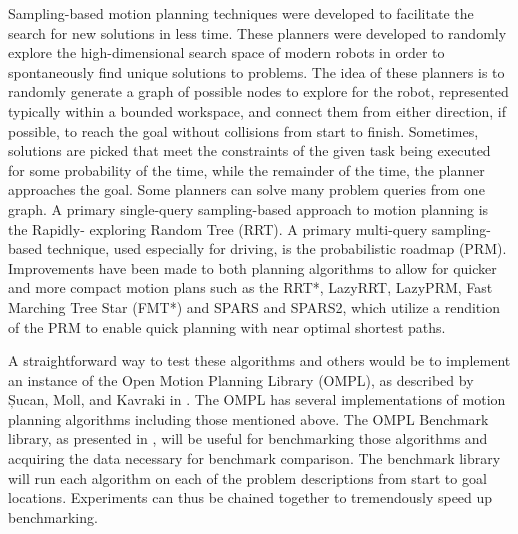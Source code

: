 \documentclass[conference]{IEEEtran} \usepackage[T1]{fontenc} \usepackage[backend=biber, style=ieee]{biblatex}
\begin{document}
Sampling-based motion planning techniques were developed to facilitate the search for new solutions in less time. These planners were developed to randomly explore the
high-dimensional search space of modern robots in order to spontaneously find unique solutions to problems. The idea of these planners is to randomly generate a graph
of possible nodes to explore for the robot, represented typically within a bounded workspace, and connect them from either direction, if possible, to reach the goal 
without collisions from start to finish. Sometimes, solutions are picked that meet the constraints of the given task being executed for some probability of the time, 
while the remainder of the time, the planner approaches the goal. Some planners can solve many problem queries from one graph. A primary single-query sampling-based approach to motion planning is the Rapidly-
exploring Random Tree (RRT). A primary multi-query sampling-based technique, used especially for driving, is the probabilistic roadmap (PRM). Improvements have been
made to both planning algorithms to allow for quicker and more compact motion plans such as the RRT*, LazyRRT, LazyPRM, Fast Marching Tree Star (FMT*) and SPARS
and SPARS2, which utilize a rendition of the PRM to enable quick planning with near optimal shortest paths. 

A straightforward way to test these algorithms and others would be to implement an instance 
of the Open Motion Planning Library (OMPL), as described by Șucan, Moll, and Kavraki in \cite{ompl}. The OMPL has several implementations of motion planning algorithms 
including those mentioned above. The OMPL Benchmark library, as presented in \cite{ompl_benchmark}, will be useful for benchmarking those algorithms and acquiring the
data necessary for benchmark comparison. The benchmark library will run each algorithm on each of the problem descriptions from start to goal locations. 
Experiments can thus be chained together to tremendously speed up benchmarking.
\end{document}
